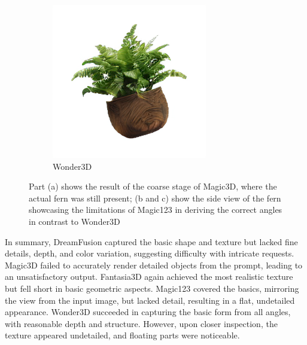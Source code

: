 \begin{figure}[ht]
\begin{subfigure}[b]{0.32\textwidth}
        \includegraphics[width=\textwidth]{etc/a high-quality rendering of a fern in a wooden pot/wonder3D/rgb_000_right.png}
        \caption{Wonder3D}
    \end{subfigure}
    \caption{Part (a) shows the result of the coarse stage of Magic3D, where the actual fern was still present; (b and c) show the side view of the fern showcasing the limitations of Magic123 in deriving the correct angles in contrast to Wonder3D}\label{fig:fernSideview}
  \end{figure}

In summary, DreamFusion captured the basic shape and texture but lacked fine details, depth, and color variation, suggesting difficulty with intricate requests. Magic3D failed to accurately render detailed objects from the prompt, leading to an unsatisfactory output. Fantasia3D again achieved the most realistic texture but fell short in basic geometric aspects. Magic123 covered the basics, mirroring the view from the input image, but lacked detail, resulting in a flat, undetailed appearance. Wonder3D succeeded in capturing the basic form from all angles, with reasonable depth and structure. However, upon closer inspection, the texture appeared undetailed, and floating parts were noticeable.\\



